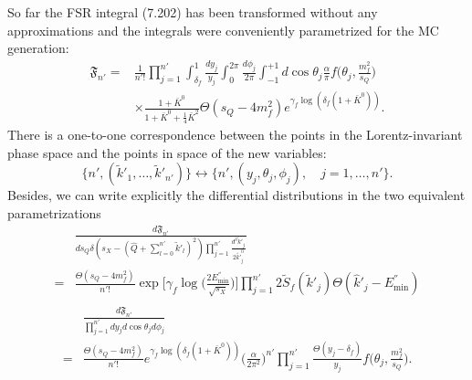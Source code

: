 So far the FSR integral (7.202) has been transformed without any approximations and the integrals were conveniently parametrized for the MC generation:
\begin{align}
\mathfrak{F}_{n'}=&\frac{1}{n'!}\prod_{j=1}^{n'}\int_{\delta_f}^{1}\frac{dy_j}{y_j}\int_{0}^{2\pi}\frac{d\phi_j}{2\pi}\int_{-1}^{+1}d\cos\theta_j\frac{\alpha}{\pi}f\biggl(\theta_j,\frac{m^2_f}{s_Q}\biggr)\nonumber\\
&\times\frac{1+\bar{K}^0}{1+\bar{K}^0+\frac{1}{4}\bar{K}^2}\Theta(s_Q-4m_f^2)e^{\gamma_f\log(\delta_f(1+\bar{K}^0))}.
\end{align}
There is a one-to-one correspondence between the points in the Lorentz-invariant phase space and the points in space of the new variables:
\begin{equation}
\{n',(\widetilde{k}'_1,\ldots,\widetilde{k}'_{n'})\}\leftrightarrow\{n',(y_j,\theta_j,\phi_j),\quad j=1,\ldots,n'\}.
\end{equation}
Besides, we can write explicitly the differential distributions in the two equivalent parametrizations
\begin{align}
&\frac{d\mathfrak{F}_{n'}}{ds_Q\delta(s_X-(\hat{Q}+\sum_{l=0}^{n'}\widetilde{k}'_l)^2)\prod_{j=1}^{n'}\frac{d^3\widetilde{k}'_j}{2\widetilde{k'}^0_j}}\nonumber\\
=&\frac{\Theta(s_Q-4m^2_f)}{n'!}\exp\biggl[\gamma_f\log\biggl(\frac{2E^{''}_\text{min}}{\sqrt{s_X}}\biggr)\biggr]\prod_{j=1}^{n'}2\widetilde{S}_f(\widetilde{k}'_j)\Theta(\widehat{k}'_j-E^{''}_\text{min})\nonumber\\
\end{align}
\begin{align}
&\frac{d\mathfrak{F}_{n'}}{\prod_{j=1}^{n'}dy_jd\cos\theta_j d\phi_j}\nonumber\\
=&\frac{\Theta(s_Q-4m^2_f)}{n'!}e^{\gamma_f\log(\delta_f(1+\bar{K}^0))}\biggl(\frac{\alpha}{2\pi^2}\biggr)^{n'}\prod_{j=1}^{n'}\frac{\Theta(y_j-\delta_f)}{y_j}f\biggl(\theta_j,\frac{m_f^2}{s_Q}\biggr).\nonumber\\
\end{align}

